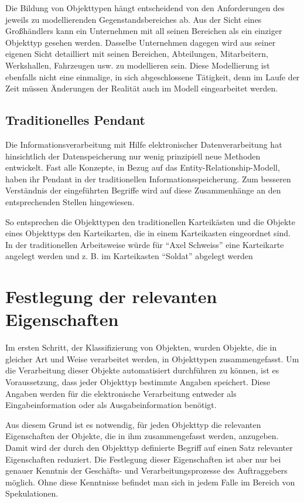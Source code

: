         Die Bildung von Objekttypen h\"angt entscheidend von den Anforderungen
        des jeweils zu modellierenden Gegenstandsbereiches ab. Aus der Sicht
        eines Gro\ss h\"andlers kann ein Unternehmen mit all seinen Bereichen
        als ein einziger Objekttyp gesehen werden. Dasselbe Unternehmen dagegen
        wird aus seiner eigenen Sicht detailliert mit seinen Bereichen,
        Abteilungen, Mitarbeitern, Werkshallen, Fahrzeugen usw. zu modellieren
        sein. Diese Modellierung ist ebenfalls nicht eine einmalige, in sich
        abgeschlossene T\"atigkeit, denn im Laufe der Zeit m\"ussen \"Anderungen
        der Realit\"at auch im Modell eingearbeitet werden.
      \subsection{Traditionelles Pendant}
        Die Informationsverarbeitung mit Hilfe elektronischer Datenverarbeitung
        hat hinsichtlich der Datenspeicherung nur wenig prinzipiell neue
        Methoden entwickelt. Fast alle Konzepte, in Bezug auf das
        Entity-Relationship-Modell, haben ihr Pendant in der traditionellen
        Informationsspeicherung. Zum besseren Verst\"andnis der eingef\"uhrten
        Begriffe wird auf diese Zusammenh\"ange an den entsprechenden Stellen
        hingewiesen.

        So entsprechen die Objekttypen den traditionellen Karteik\"asten und die
        Objekte eines Objekttyps den Karteikarten, die in einem Karteikasten
        eingeordnet sind. In der traditionellen Arbeitsweise w\"urde f\"ur
        \enquote{Axel Schweiss} eine Karteikarte angelegt werden und z. B. im
        Karteikasten \enquote{Soldat} abgelegt werden
\clearpage
    \section{Festlegung der relevanten Eigenschaften}
      Im ersten Schritt, der Klassifizierung von Objekten, wurden Objekte, die
      in gleicher Art und Weise verarbeitet werden, in Objekttypen
      zusammengefasst. Um die Verarbeitung dieser Objekte automatisiert
      durchf\"uhren zu k\"onnen, ist es Voraussetzung, dass jeder Objekttyp
      bestimmte Angaben speichert. Diese Angaben werden f\"ur die elektronische
      Verarbeitung entweder als Eingabeinformation oder als Ausgabeinformation
      ben\"otigt.
      
      Aus diesem Grund ist es notwendig, f\"ur jeden Objekttyp die relevanten
      Eigenschaften der Objekte, die in ihm zusammengefasst werden, anzugeben.
      Damit wird der durch den Objekttyp definierte Begriff auf einen Satz
      relevanter Eigenschaften reduziert. Die Festlegung dieser Eigenschaften
      ist aber nur bei genauer Kenntnis der Gesch\"afts- und
      Verarbeitungsprozesse des Auftraggebers m\"oglich. Ohne diese Kenntnisse
      befindet man sich in jedem Falle im Bereich von Spekulationen.
